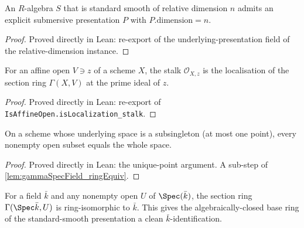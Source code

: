 \begin{lemma}
  \label{lem:exists_submersivePresentation_of_standardSmoothReldim}
  An \(R\)-algebra \(S\) that is standard smooth of relative dimension \(n\) admits an
  explicit submersive presentation \(P\) with \(P.\mathrm{dimension} = n\).
\end{lemma}

\begin{proof}
  Proved directly in Lean: re-export of the underlying-presentation field of the
  relative-dimension instance.
\end{proof}

\begin{lemma}
  \label{lem:isLocalization_atPrime_stalk_of_affineOpen}
  For an affine open \(V \ni z\) of a scheme \(X\), the stalk \(\mathcal O_{X,z}\) is
  the localisation of the section ring \(\Gamma(X, V)\) at the prime ideal of \(z\).
\end{lemma}

\begin{proof}
  Proved directly in Lean: re-export of \texttt{IsAffineOpen.isLocalization\_stalk}.
\end{proof}

\begin{lemma}
  \label{lem:open_eq_top_of_subsingleton}
  On a scheme whose underlying space is a subsingleton (at most one point), every
  nonempty open subset equals the whole space.
\end{lemma}

\begin{proof}
  Proved directly in Lean: the unique-point argument. A sub-step of
  \cref{lem:gammaSpecField_ringEquiv}.
\end{proof}

\begin{lemma}
  \label{lem:gammaSpecField_ringEquiv}
  For a field \(\bar k\) and any nonempty open \(U\) of \(\Spec(\bar k)\), the section
  ring \(\Gamma(\Spec \bar k, U)\) is ring-isomorphic to \(\bar k\). This gives the
  algebraically-closed base ring of the standard-smooth presentation a clean
  \(\bar k\)-identification.
\end{lemma}

